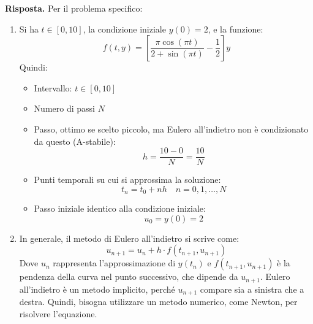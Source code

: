 \begin{itemize}
    \highspace
    \textbf{Risposta.} Per il problema specifico:
    \begin{enumerate}
        \item Si ha $t \in \left[0, 10\right]$, la condizione iniziale $y(0) = 2$, e la funzione:
        \begin{equation*}
            f(t, y) = \left[\dfrac{\pi \cos\left(\pi t\right)}{2 + \sin\left(\pi t\right)} - \dfrac{1}{2}\right] y
        \end{equation*}
        Quindi:
        \begin{itemize}
            \item Intervallo: $t \in \left[0, 10\right]$
            \item Numero di passi $N$
            \item Passo, ottimo se scelto piccolo, ma Eulero all'indietro non è condizionato da questo (A-stabile):
            \begin{equation*}
                h = \dfrac{10 - 0}{N} = \dfrac{10}{N}
            \end{equation*}
            \item Punti temporali su cui si approssima la soluzione:
            \begin{equation*}
                t_n = t_0 + n h \quad n = 0, 1, \dots, N
            \end{equation*}
            \item Passo iniziale identico alla condizione iniziale:
            \begin{equation*}
                u_0 = y(0) = 2
            \end{equation*}
        \end{itemize}

        \item In generale, il metodo di Eulero all'indietro si scrive come:
        \begin{equation*}
            u_{n+1} = u_{n} + h \cdot f\left(t_{n+1}, u_{n+1}\right)
        \end{equation*}
        Dove $u_{n}$ rappresenta l'approssimazione di $y(t_{n})$ e $f(t_{n+1}, u_{n+1})$ è la pendenza della curva nel punto successivo, che dipende da $u_{n+1}$. Eulero all'indietro è un metodo implicito, perché $u_{n+1}$ compare sia a sinistra che a destra. Quindi, bisogna utilizzare un metodo numerico, come Newton, per risolvere l'equazione.


\end{enumerate}
\end{itemize}
